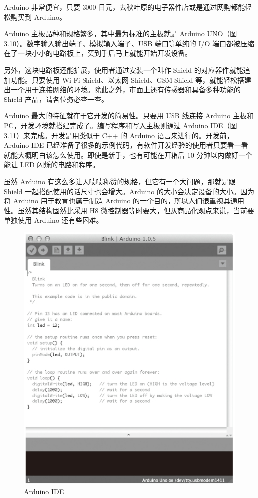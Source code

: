 \documentclass[12pt,UTF8]{ctexbook}
\begin{document}
Arduino 非常便宜，只要 3000 日元，去秋叶原的电子器件店或是通过网购都能轻松购买到 Arduino。

Arduino 主板品种和规格繁多，其中最为标准的主板就是 Arduino UNO（图 3.10）。数字输入输出端子、模拟输入端子、USB 端口等单纯的 I/O 端口都被压缩在了一块小小的电路板上，买到手后马上就能开始开发设备。

另外，这块电路板还能扩展，使用者通过安装一个叫作 Shield 的对应器件就能追加功能。只要使用 Wi-Fi Shield、以太网 Shield、GSM Shield 等，就能轻松搭建出一个用于连接网络的环境。除此之外，市面上还有传感器和具备多种功能的 Shield 产品，请各位务必查一查。

Arduino 最大的特征就在于它开发的简易性。只要用 USB 线连接 Arduino 主板和 PC，开发环境就搭建完成了。编写程序和写入主板则通过 Arduino IDE（图 3.11）来完成。开发是用类似于 C++ 的 Arduino 语言来进行的。开发前，Arduino IDE 已经准备了很多的示例代码，有软件开发经验的使用者只要看一看就能大概明白该怎么使用。即使是新手，也有可能在开箱后 10 分钟以内做好一个能让 LED 闪烁的电路和程序。

虽然 Arduino 有这么多让人啧啧称赞的规格，但它有一个大问题，那就是跟 Shield 一起搭配使用的话尺寸也会增大。Arduino 的大小会决定设备的大小。因为将 Arduino 用于教育也属于制造 Arduino 的一个目的，所以人们很重视其通用性。虽然其结构固然比采用 H8 微控制器等时要大，但从商品化观点来说，当前要单独使用 Arduino 还有些困难。

\begin{figure}[htbp]
	\centering
	\includegraphics[width=1\linewidth]{62}
	\caption{Arduino IDE}
	\label{fig:1}
\end{figure}
\end{document}
